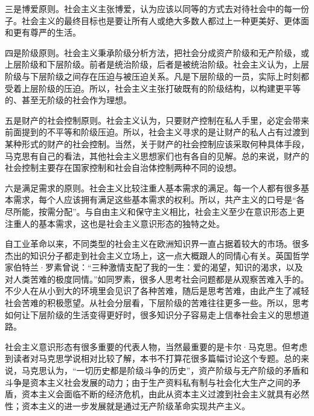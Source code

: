 三是博爱原则。社会主义主张博爱，认为应该以同等的方式去对待社会中的每一份子。社会主义的最终目标也是要让所有人或绝大多数人都过上一种更美好、更体面和更有尊严的生活。

四是阶级原则。社会主义秉承阶级分析方法，把社会分成资产阶级和无产阶级，或上层阶级和下层阶级。前者是统治阶级，后者是被统治阶级。社会主义认为，上层阶级与下层阶级之间存在压迫与被压迫关系。凡是下层阶级的一员，实际上时刻都受着上层阶级的压迫。所以，社会主义主张打破既有的阶级结构，以构建更平等的、甚至无阶级的社会作为理想。

五是财产的社会控制原则。社会主义认为，只要财产控制在私人手里，必定会带来前面提到的不平等和阶级压迫。所以，社会主义寻求的是让财产的私人占有过渡到某种形式的财产的社会控制。当然，关于财产的社会控制应该采取何种具体手段，马克思有自己的看法，其他社会主义思想家们也有各自的见解。总的来说，财产的社会控制主要存在国家控制和社会自治体控制两种不同的设想。

六是满足需求的原则。社会主义比较注重人基本需求的满足。每一个人都有很多基本需求，每个人应该拥有满足这些基本需求的权利。所以，共产主义的口号是“各尽所能，按需分配”。与自由主义和保守主义相比，社会主义至少在意识形态上更注重人的基本需求，这也是社会主义意识形态的独特之处。

自工业革命以来，不同类型的社会主义在欧洲知识界一直占据着较大的市场。很多杰出的知识分子都走到社会主义立场上，这一点大概跟人的同情心有关。英国哲学家伯特兰·罗素曾说：“三种激情支配了我的一生：爱的渴望，知识的渴求，以及对人类苦难的极度同情。”如同罗素，很多人思考社会问题都是从观察苦难入手的。不少人在从小到大的环境里会见识了各种苦难，随后是思考苦难，由此产生了减轻社会苦难的积极愿望。从社会分层看，下层阶级的苦难往往更多一些。所以，思考如何让下层阶级的生活变得更好时，很多知识分子容易走上信奉社会主义的思想道路。


社会主义意识形态有很多重要的代表人物，当然最重要的是卡尔·马克思。但考虑到读者对马克思学说相对比较了解，本书不打算花很多篇幅讨论这个专题。总的来说，马克思认为，“一切历史都是阶级斗争的历史”，资产阶级与无产阶级的矛盾和斗争是资本主义社会发展的动力；由于生产资料私有制与社会化大生产之间的矛盾，资本主义会面临不断的经济危机，由此从资本主义过渡到社会主义就具有必然性；资本主义的进一步发展就是通过无产阶级革命实现共产主义。

